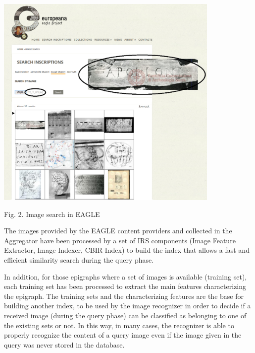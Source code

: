  \includegraphics[width=10.848cm,height=10.451cm]{EAGLE2016submissionXX-img002.png} 

Fig. 2. Image search in EAGLE


\bigskip

The images provided by the EAGLE content providers and collected in the Aggregator have been processed by a set of IRS
components (Image Feature Extractor, Image Indexer, CBIR Index) to build the index that allows a fast and efficient
similarity search during the query phase.

In addition, for those epigraphs where a set of images is available (training set), each training set has been processed
to extract the main features characterizing the epigraph. The training sets and the characterizing features are the
base for building another index, to be used by the image recognizer in order to decide if a received image (during the
query phase) can be classified as belonging to one of the existing sets or not. In this way, in many cases, the
recognizer is able to properly recognize the content of a query image even if the image given in the query was never
stored in the database.


\bigskip

